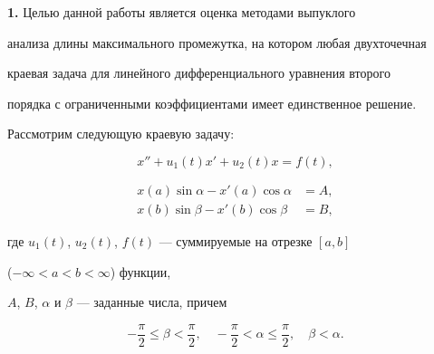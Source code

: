 \pagestyle{plain} %


 




\maketitle 


\label{begin} 


 


 


{\bf 1.} Целью данной работы является оценка методами выпуклого 


анализа длины максимального промежутка, на котором любая двухточечная 


краевая задача для линейного дифференциального уравнения второго 


порядка с ограниченными коэффициентами имеет единственное решение. 


 


Рассмотрим следующую краевую задачу: 


\begin{equation} 


x''+u_1(t)x'+u_2(t)x=f(t), 


\end{equation} 




\begin{equation} 


\begin{split} 


x(a)\sin\alpha-x'(a)\cos\alpha&=A,\\ 


x(b)\sin\beta-x'(b)\cos\beta&=B, 


\end{split} 


\end{equation} 


где $u_1(t)$, $u_2(t)$, $f(t)$ --- суммируемые на отрезке $[a,b]$ 


($-\infty<a<b<\infty$) функции, 


$A$, $B$, $\alpha$ и $\beta$ --- заданные числа, причем 


\begin{equation} 


-\frac{\pi}{2}\le\beta<\frac{\pi}{2},\quad 


-\frac{\pi}{2}<\alpha\le\frac{\pi}{2},\quad \beta<\alpha. 


\end{equation} 


